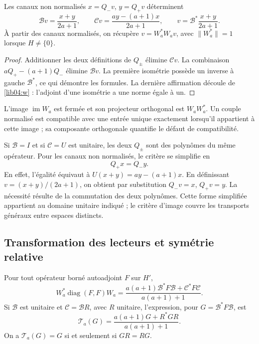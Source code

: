\begin{proposition}
\label{lib04:prop-recuperacion}
Les canaux non normalisés \(x=Q_-v\), \(y=Q_+v\) déterminent
\begin{equation}
 \mathcal Bv=\frac{x+y}{2a+1},\qquad
 \mathcal Cv=\frac{ay-(a+1)x}{2a+1},\qquad
 v=\mathcal B^*\frac{x+y}{2a+1}.
 \label{lib04:inversa-canales}
\end{equation}
À partir des canaux normalisés, on récupère
\(v=W_a^*W_av\), avec \(\|W_a^*\|=1\) lorsque \(H\neq\{0\}\).
\end{proposition}

\begin{proof}
Additionner les deux définitions de \(Q_\pm\) élimine \(\mathcal Cv\). La combinaison \(aQ_+-(a+1)Q_-\) élimine \(\mathcal Bv\). La première isométrie possède un inverse à gauche \(\mathcal B^*\), ce qui démontre les formules. La dernière affirmation découle de \eqref{lib04:w} : l'adjoint d'une isométrie a une norme égale à un.
\end{proof}

L’image \(\operatorname{im}W_a\) est fermée et son projecteur
orthogonal est \(W_aW_a^*\). Un couple normalisé est compatible avec une
entrée unique exactement lorsqu’il appartient à cette image ; sa composante
orthogonale quantifie le défaut de compatibilité.

Si \(\mathcal B=I\) et si \(\mathcal C=U\) est unitaire, les deux
\(Q_\pm\) sont des polynômes du même opérateur. Pour les canaux non
normalisés, le critère se simplifie en
\begin{equation}
 Q_+x=Q_-y.
 \label{lib04:compatibilidad-unitaria}
\end{equation}
En effet, l’égalité équivaut à
\(U(x+y)=ay-(a+1)x\). En définissant
\(v=(x+y)/(2a+1)\), on obtient par substitution
\(Q_-v=x\), \(Q_+v=y\). La nécessité résulte de la commutation
des deux polynômes. Cette forme simplifiée appartient au domaine
unitaire indiqué ; le critère d’image couvre les transports
généraux entre espaces distincts.

\subsection{Transformation des lecteurs et symétrie relative}
\label{lib04:lectores}

\begin{theorem}
\label{lib04:teo-lector}
Pour tout opérateur borné autoadjoint \(F\) sur \(H'\),
\begin{equation}
 W_a^*\operatorname{diag}(F,F)W_a
 =\frac{a(a+1)\mathcal B^*F\mathcal B+
                  \mathcal C^*F\mathcal C}{a(a+1)+1}.
 \label{lib04:lector-general}
\end{equation}
Si \(\mathcal B\) est unitaire et \(\mathcal C=\mathcal BR\), avec \(R\) unitaire, l'expression, pour \(G=\mathcal B^*F\mathcal B\), est
\begin{equation}
 \mathcal T_a(G)=\frac{a(a+1)G+R^*GR}{a(a+1)+1}.
 \label{lib04:lector-relativo}
\end{equation}
On a \(\mathcal T_a(G)=G\) si et seulement si \(GR=RG\).
\end{theorem}

